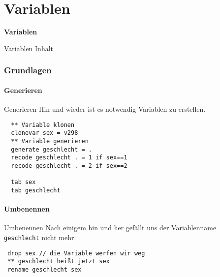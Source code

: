 \part{Variablen}
\begin{frame}
\thispagestyle{empty}
\textbf{\huge{Variablen}}
\end{frame}

\begin{frame}{Variablen Inhalt}
 \tableofcontents
\end{frame}

\section{Grundlagen}
\subsection{Generieren}
\begin{frame}[fragile]{Generieren}      
Hin und wieder ist es notwendig Variablen zu erstellen.
\begin{lstlisting}
  ** Variable klonen
  clonevar sex = v298
  ** Variable generieren
  generate geschlecht = .
  recode geschlecht . = 1 if sex==1
  recode geschlecht . = 2 if sex==2

  tab sex
  tab geschlecht
\end{lstlisting}
\end{frame}

\subsection{Umbenennen}
\begin{frame}[fragile]{Umbenennen}
Nach einigem hin und her gefällt uns der Variablenname \texttt{geschlecht} nicht mehr.  
\begin{lstlisting}
 drop sex // die Variable werfen wir weg 
 ** geschlecht heißt jetzt sex
 rename geschlecht sex
\end{lstlisting}
\end{frame}


